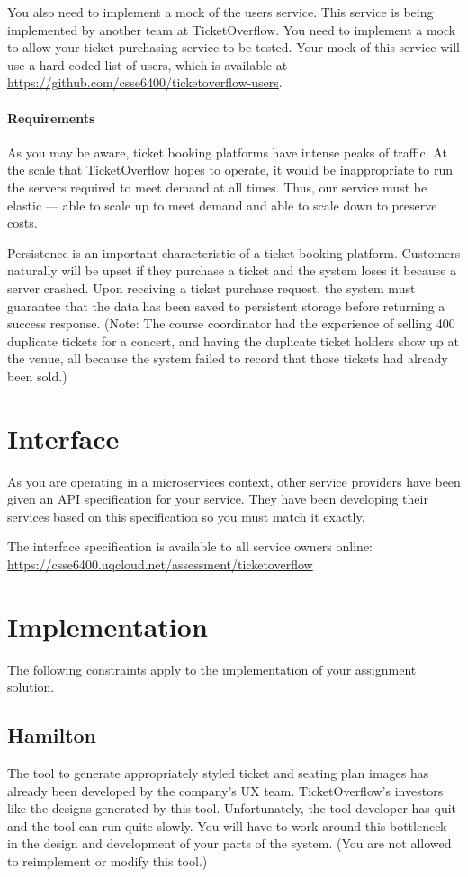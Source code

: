 \documentclass{csse4400}
\begin{document}
You also need to implement a mock of the users service.
This service is being implemented by another team at TicketOverflow.
You need to implement a mock to allow your ticket purchasing service to be tested.
Your mock of this service will use a hard-coded list of users,
which is available at \url{https://github.com/csse6400/ticketoverflow-users}.

\paragraph{Requirements}
As you may be aware,
ticket booking platforms have intense peaks of traffic.
At the scale that TicketOverflow hopes to operate,
it would be inappropriate to run the servers required to meet demand at all times.
Thus, our service must be elastic --- able to scale up to meet demand and able to scale down to preserve costs.

Persistence is an important characteristic of a ticket booking platform.
Customers naturally will be upset if they purchase a ticket and the system loses it because a server crashed.
Upon receiving a ticket purchase request,
the system must guarantee that the data has been saved to persistent storage before returning a success response.
(Note: The course coordinator had the experience of selling 400 duplicate tickets for a concert,
and having the duplicate ticket holders show up at the venue,
all because the system failed to record that those tickets had already been sold.)

\section{Interface}
As you are operating in a microservices context,
other service providers have been given an API specification for your service.
They have been developing their services based on this specification so you must match it exactly.

The interface specification is available to all service owners online:
\url{https://csse6400.uqcloud.net/assessment/ticketoverflow}

\section{Implementation}
The following constraints apply to the implementation of your assignment solution.

\subsection{Hamilton}
The tool to generate appropriately styled ticket and seating plan images has already been developed by the company's UX team.
TicketOverflow's investors like the designs generated by this tool.
Unfortunately, the tool developer has quit and the tool can run quite slowly.
You will have to work around this bottleneck in the design and development of your parts of the system.
(You are not allowed to reimplement or modify this tool.)
\end{document}
